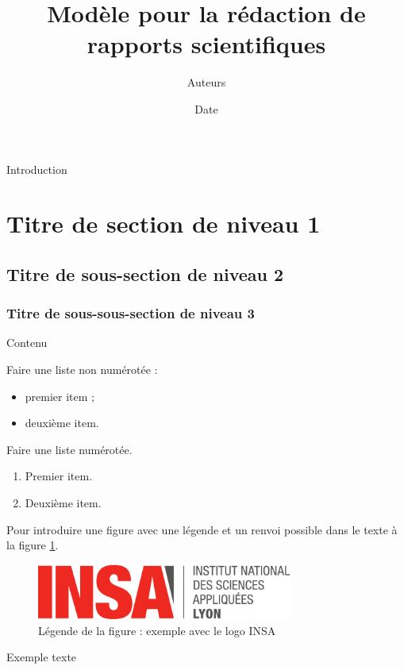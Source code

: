 \documentclass[11pt, a4paper]{article}
\title{Modèle pour la rédaction de rapports scientifiques}
\author{Auteurs}
\date{Date}
\begin{document}
\maketitle
\thispagestyle{fancy}


Introduction

\section{Titre de section de niveau 1}
\subsection{Titre de sous-section de niveau 2}
\subsubsection{Titre de sous-sous-section de niveau 3}

Contenu

\bigskip


Faire une liste non numérotée :
\begin{itemize}
\item premier item ;
\item deuxième item.
\end{itemize}

\bigskip

Faire une liste numérotée. 
\begin{enumerate}
\item Premier item. 
\item Deuxième item.
\end{enumerate}

\bigskip

Pour introduire une figure avec une légende et un renvoi possible dans le texte à la figure \ref{insa}. 

\begin{figure}[h] %
\centering %
\includegraphics[width=0.75\textwidth]{insa} %
\caption{Légende de la figure : exemple avec le logo INSA} %
\label{insa}%
\end{figure}

Exemple texte


\lipsum %
\end{document}
